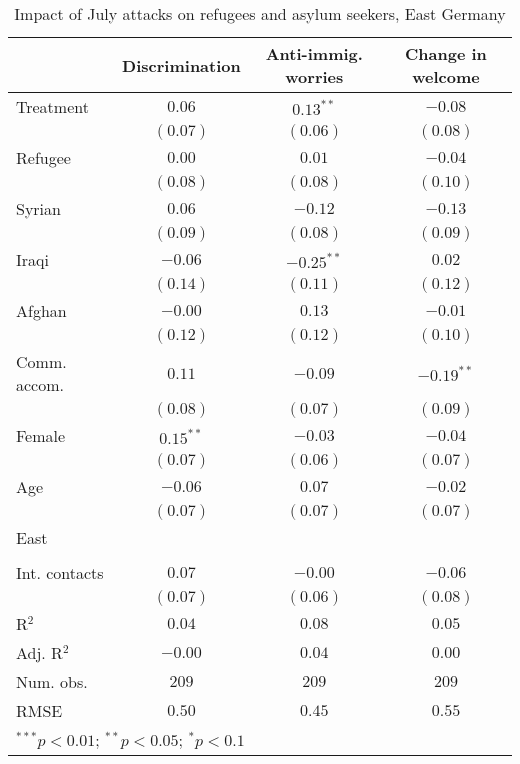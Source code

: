 
\begin{table}
\caption{Impact of July attacks on refugees and asylum seekers, East Germany}
\begin{center}
\begin{tabular}{l c c c}
\toprule
 & Discrimination & Anti-immig. worries & Change in welcome \\
\midrule
Treatment     & $0.06$      & $0.13^{**}$  & $-0.08$      \\
              & $(0.07)$    & $(0.06)$     & $(0.08)$     \\
Refugee       & $0.00$      & $0.01$       & $-0.04$      \\
              & $(0.08)$    & $(0.08)$     & $(0.10)$     \\
Syrian        & $0.06$      & $-0.12$      & $-0.13$      \\
              & $(0.09)$    & $(0.08)$     & $(0.09)$     \\
Iraqi         & $-0.06$     & $-0.25^{**}$ & $0.02$       \\
              & $(0.14)$    & $(0.11)$     & $(0.12)$     \\
Afghan        & $-0.00$     & $0.13$       & $-0.01$      \\
              & $(0.12)$    & $(0.12)$     & $(0.10)$     \\
Comm. accom.  & $0.11$      & $-0.09$      & $-0.19^{**}$ \\
              & $(0.08)$    & $(0.07)$     & $(0.09)$     \\
Female        & $0.15^{**}$ & $-0.03$      & $-0.04$      \\
              & $(0.07)$    & $(0.06)$     & $(0.07)$     \\
Age           & $-0.06$     & $0.07$       & $-0.02$      \\
              & $(0.07)$    & $(0.07)$     & $(0.07)$     \\
East          &             &              &              \\
              &             &              &              \\
Int. contacts & $0.07$      & $-0.00$      & $-0.06$      \\
              & $(0.07)$    & $(0.06)$     & $(0.08)$     \\
\midrule
R$^2$         & $0.04$      & $0.08$       & $0.05$       \\
Adj. R$^2$    & $-0.00$     & $0.04$       & $0.00$       \\
Num. obs.     & $209$       & $209$        & $209$        \\
RMSE          & $0.50$      & $0.45$       & $0.55$       \\
\bottomrule
\multicolumn{4}{l}{\scriptsize{$^{***}p<0.01$; $^{**}p<0.05$; $^{*}p<0.1$}}
\end{tabular}
\label{tab_host_east}
\end{center}
\end{table}
